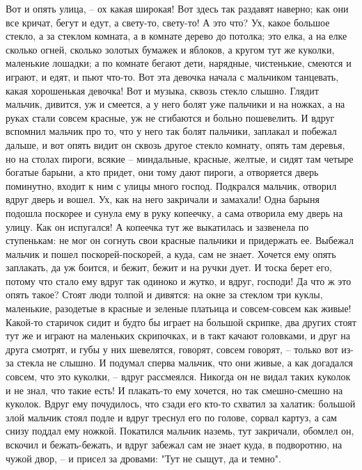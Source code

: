 \documentclass[a4paper, 12pt]{article}
\begin{document}
    Вот и опять улица, -- ох какая широкая! Вот здесь так раздавят наверно; как они все кричат, бегут и едут, а свету-то, свету-то! А это что? Ух, какое большое стекло, а за стеклом комната, а в комнате дерево до потолка; это елка, а на елке сколько огней, сколько золотых бумажек и яблоков, а кругом тут же куколки, маленькие лошадки; а по комнате бегают дети, нарядные, чистенькие, смеются и играют, и едят, и пьют что-то. Вот эта девочка начала с мальчиком танцевать, какая хорошенькая девочка! Вот и музыка, сквозь стекло слышно. Глядит мальчик, дивится, уж и смеется, а у него болят уже пальчики и на ножках, а на руках стали совсем красные, уж не сгибаются и больно пошевелить. И вдруг вспомнил мальчик про то, что у него так болят пальчики, заплакал и побежал дальше, и вот опять видит он сквозь другое стекло комнату, опять там деревья, но на столах пироги, всякие -- миндальные, красные, желтые, и сидят там четыре богатые барыни, а кто придет, они тому дают пироги, а отворяется дверь поминутно, входит к ним с улицы много господ. Подкрался мальчик, отворил вдруг дверь и вошел. Ух, как на него закричали и замахали! Одна барыня подошла поскорее и сунула ему в руку копеечку, а сама отворила ему дверь на улицу. Как он испугался! А копеечка тут же выкатилась и зазвенела по ступенькам: не мог он согнуть свои красные пальчики и придержать ее. Выбежал мальчик и пошел поскорей-поскорей, а куда, сам не знает. Хочется ему опять заплакать, да уж боится, и бежит, бежит и на ручки дует. И тоска берет его, потому что стало ему вдруг так одиноко и жутко, и вдруг, господи! Да что ж это опять такое? Стоят люди толпой и дивятся: на окне за стеклом три куклы, маленькие, разодетые в красные и зеленые платьица и совсем-совсем как живые! Какой-то старичок сидит и будто бы играет на большой скрипке, два других стоят тут же и играют на маленьких скрипочках, и в такт качают головками, и друг на друга смотрят, и губы у них шевелятся, говорят, совсем говорят, -- только вот из-за стекла не слышно. И подумал сперва мальчик, что они живые, а как догадался совсем, что это куколки, -- вдруг рассмеялся. Никогда он не видал таких куколок и не знал, что такие есть! И плакать-то ему хочется, но так смешно-смешно на куколок. Вдруг ему почудилось, что сзади его кто-то схватил за халатик: большой злой мальчик стоял подле и вдруг треснул его по голове, сорвал картуз, а сам снизу поддал ему ножкой. Покатился мальчик наземь, тут закричали, обомлел он, вскочил и бежать-бежать, и вдруг забежал сам не знает куда, в подворотню, на чужой двор, -- и присел за дровами: "Тут не сыщут, да и темно". 
    
\end{document}
